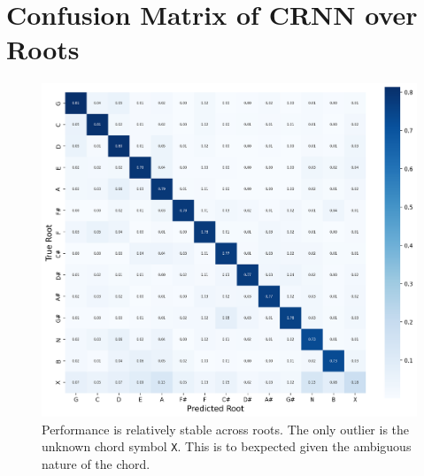 \section{Confusion Matrix of CRNN over Roots}\label{app:cm_roots}

\begin{figure}[H]
    \centering
    \includegraphics[width=1.0\textwidth]{figures/confusion_matrix_roots.png}
    \caption{Performance is relatively stable across roots. The only outlier is the unknown chord symbol \texttt{X}. This is to bexpected given the ambiguous nature of the chord. }
    \label{fig:cm_roots}
\end{figure}



